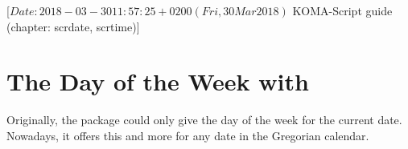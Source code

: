 %
%
%
%
%
%
%
%
% 
%
%
%
%

                 [$Date: 2018-03-30 11:57:25 +0200 (Fri, 30 Mar 2018) $
                  KOMA-Script guide (chapter: scrdate, scrtime)]


\chapter{The Day of the Week with }
\BeginIndexGroup
{}

Originally, the  package could only give the day of the week
for the current date. Nowadays, it offers this and more for any date in the
Gregorian calendar.


